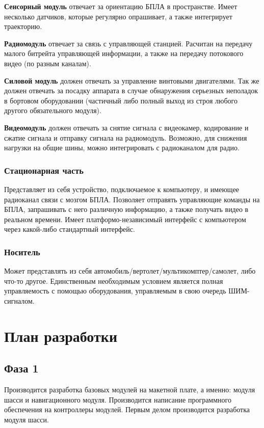 \documentclass[utf8]{report}
\begin{document}
\textbf{Сенсорный модуль} отвечает за ориентацию БПЛА в пространстве. Имеет несколько датчиков, которые регулярно опрашивает, а также интегрирует траекторию.

\textbf{Радиомодуль} отвечает за связь с управляющей станцией. Расчитан на передачу малого битрейта управляющей информации, а также на передачу потокового видео (по разным каналам).

\textbf{Силовой модуль} должен отвечать за управление винтовыми двигателями. Так же должен отвечать за посадку аппарата в случае обнаружения серьезных неполадок в бортовом оборудовании (частичный либо полный выход из строя любого другого обязательного модуля).

\textbf{Видеомодуль} должен отвечать за снятие сигнала с видеокамер, кодирование и сжатие сигнала и отправку сигнала на радиомодуль. Возможно, для снижения нагрузки на общие шины, можно интегрировать с радиоканалом для радио.

\subsection{Стационарная часть}

Представляет из себя устройство, подключаемое к компьютеру, и имеющее радиоканал связи с мозгом БПЛА. Позволяет отправять управляющие команды на БПЛА, запрашивать с него различную информацию, а также получать видео в реальном времени. Имеет платформо-независимый интерфейс с компьютером через какой-либо стандартный интерфейс.

\subsection{Носитель}

Может представлять из себя автомобиль/вертолет/мультикомптер/самолет, либо что-то другое. Единственным необходимым условием является полная управляемость с помощью оборудования, управляемым в свою очередь ШИМ-сигналом.

\chapter{План разработки}

\section{Фаза 1}

Производится разработка базовых модулей на макетной плате, а именно: модуля шасси и навигационного модуля. Производится написание программного обеспечения на контроллеры модулей. Первым делом производится разработка модуля шасси.
\end{document}
